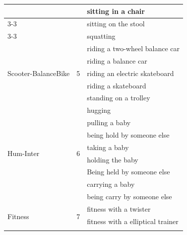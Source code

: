 \begin{appendix}
\begin{table}[ht]
{\begin{tabular}{l|c|l}
                                     &                     & sitting in a chair                 \\ \cline{3-3} 
                                     &                     & sitting on the stool               \\ \cline{3-3} 
                                     &                     & squatting                          \\ \hline
\multirow{5}{*}{Scooter-BalanceBike} & \multirow{5}{*}{5}  & riding a two-wheel balance car     \\ \cline{3-3} 
                                     &                     & riding a balance car               \\ \cline{3-3} 
                                     &                     & riding an electric skateboard      \\ \cline{3-3} 
                                     &                     & riding a skateboard                \\ \cline{3-3} 
                                     &                     & standing on a trolley              \\ \hline
\multirow{8}{*}{Hum-Inter}           & \multirow{8}{*}{6}  & hugging                            \\ \cline{3-3} 
                                     &                     & pulling a baby                     \\ \cline{3-3} 
                                     &                     & being hold by someone else         \\ \cline{3-3} 
                                     &                     & taking a baby                      \\ \cline{3-3} 
                                     &                     & holding the baby                   \\ \cline{3-3} 
                                     &                     & Being held by someone else         \\ \cline{3-3} 
                                     &                     & carrying a baby                    \\ \cline{3-3} 
                                     &                     & being carry by someone else        \\ \hline
\multirow{3}{*}{Fitness}             & \multirow{3}{*}{7}  & fitness with a twister             \\ \cline{3-3} 
                                     &                     & fitness with a elliptical trainer  \\ \cline{3-3} 

\end{tabular}}
\end{table}
\end{appendix}

